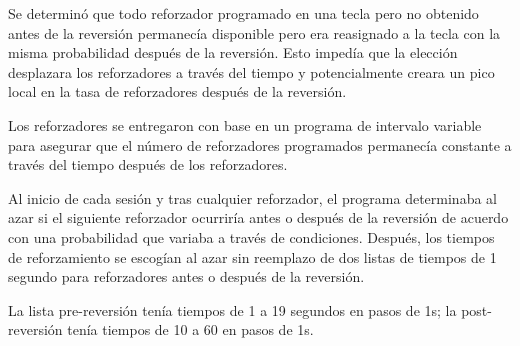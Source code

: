 \documentclass[a4paper,12pt]{article}
\begin{document}
Se determinó que todo reforzador programado en una tecla pero no obtenido antes de la reversión permanecía disponible pero era reasignado a la tecla con la misma probabilidad después de la reversión. Esto impedía que la elección desplazara los reforzadores a través del tiempo y potencialmente creara un pico local en la tasa de reforzadores después de la reversión.

Los reforzadores se entregaron con base en un programa de intervalo variable para asegurar que el número de reforzadores programados permanecía constante a través del tiempo después de los reforzadores.

Al inicio de cada sesión y tras cualquier reforzador, el programa determinaba al azar si el siguiente reforzador ocurriría antes o después de la reversión de acuerdo con una probabilidad que variaba a través de condiciones. Después, los tiempos de reforzamiento se escogían al azar sin reemplazo de dos listas de tiempos de 1 segundo para reforzadores antes o después de la reversión.

La lista pre-reversión tenía tiempos de 1 a 19 segundos en pasos de 1s; la post-reversión tenía tiempos de 10 a 60 en pasos de 1s.
\end{document}
